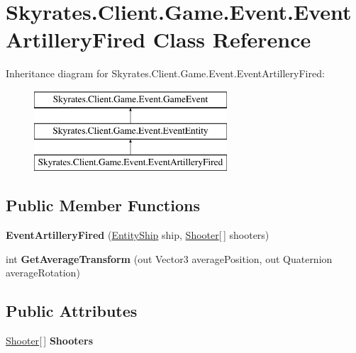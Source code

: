 \hypertarget{class_skyrates_1_1_client_1_1_game_1_1_event_1_1_event_artillery_fired}{\section{Skyrates.\-Client.\-Game.\-Event.\-Event\-Artillery\-Fired Class Reference}
\label{class_skyrates_1_1_client_1_1_game_1_1_event_1_1_event_artillery_fired}
}
Inheritance diagram for Skyrates.\-Client.\-Game.\-Event.\-Event\-Artillery\-Fired\-:\begin{figure}[H]
\begin{center}
\leavevmode
\includegraphics[height=3.000000cm]{class_skyrates_1_1_client_1_1_game_1_1_event_1_1_event_artillery_fired}
\end{center}
\end{figure}
\subsection*{Public Member Functions}
\begin{DoxyCompactItemize}
\item 
\hypertarget{class_skyrates_1_1_client_1_1_game_1_1_event_1_1_event_artillery_fired_a24dc075d0ff12e05a7b9d81cf3262758}{{\bfseries Event\-Artillery\-Fired} (\hyperlink{class_skyrates_1_1_client_1_1_entity_1_1_entity_ship}{Entity\-Ship} ship, \hyperlink{class_skyrates_1_1_client_1_1_mono_1_1_shooter}{Shooter}\mbox{[}$\,$\mbox{]} shooters)}\label{class_skyrates_1_1_client_1_1_game_1_1_event_1_1_event_artillery_fired_a24dc075d0ff12e05a7b9d81cf3262758}

\item 
\hypertarget{class_skyrates_1_1_client_1_1_game_1_1_event_1_1_event_artillery_fired_a58bb7b842dad16ff93c6702295648238}{int {\bfseries Get\-Average\-Transform} (out Vector3 average\-Position, out Quaternion average\-Rotation)}\label{class_skyrates_1_1_client_1_1_game_1_1_event_1_1_event_artillery_fired_a58bb7b842dad16ff93c6702295648238}

\end{DoxyCompactItemize}
\subsection*{Public Attributes}
\begin{DoxyCompactItemize}
\item 
\hypertarget{class_skyrates_1_1_client_1_1_game_1_1_event_1_1_event_artillery_fired_a9f5e4a291e93d6611f840341b84a78e6}{\hyperlink{class_skyrates_1_1_client_1_1_mono_1_1_shooter}{Shooter}\mbox{[}$\,$\mbox{]} {\bfseries Shooters}}\label{class_skyrates_1_1_client_1_1_game_1_1_event_1_1_event_artillery_fired_a9f5e4a291e93d6611f840341b84a78e6}

\end{DoxyCompactItemize}


